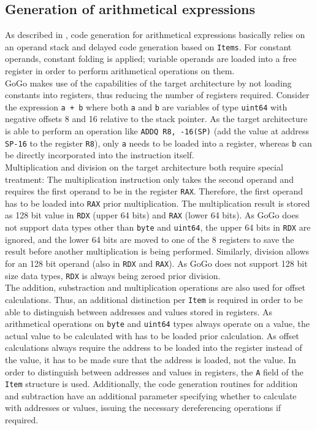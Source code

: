 \documentclass[a4paper]{scrartcl}
\let\section\subsection
\let\subsection\subsubsection
\let\subsubsection\paragraph
\let\paragraph\subparagraph
\let\subparagraph\undefined
\begin{document}
    \section{Generation of arithmetical expressions}
      As described in \cite{wir96}, code generation for arithmetical expressions basically relies on an operand stack and delayed code generation based on \texttt{Items}. For constant operands, constant folding is applied; variable operands are loaded into a free register in order to perform arithmetical operations on them.\\
      GoGo makes use of the capabilities of the target architecture by not loading constants into registers, thus reducing the number of registers required. Consider the expression \texttt{a + b} where both \texttt{a} and \texttt{b} are variables of type \texttt{uint64} with negative offsets 8 and 16 relative to the stack pointer. As the target architecture is able to perform an operation like \texttt{ADDQ R8, -16(SP)} (add the value at address \texttt{SP-16} to the register \texttt{R8}), only \texttt{a} needs to be loaded into a register, whereas \texttt{b} can be directly incorporated into the instruction itself.\\
      Multiplication and division on the target architecture both require special treatment: The multiplication instruction only takes the second operand and requires the first operand to be in the register \texttt{RAX}\cite{int09}. Therefore, the first operand has to be loaded into \texttt{RAX} prior multiplication. The multiplication result is stored as 128 bit value in \texttt{RDX} (upper 64 bits) and \texttt{RAX} (lower 64 bits). As GoGo does not support data types other than \texttt{byte} and \texttt{uint64}, the upper 64 bits in \texttt{RDX} are ignored, and the lower 64 bits are moved to one of the 8 registers to save the result before another multiplication is being performed. Similarly, division allows for an 128 bit operand (also in \texttt{RDX} and \texttt{RAX}). As GoGo does not support 128 bit size data types, \texttt{RDX} is always being zeroed prior division.\\
      The addition, substraction and multiplication operations are also used for offset calculations. Thus, an additional distinction per \texttt{Item} is required in order to be able to distinguish between addresses and values stored in registers. As arithmetical operations on \texttt{byte} and \texttt{uint64} types always operate on a value, the actual value to be calculated with has to be loaded prior calculation. As offset calculations always require the address to be loaded into the register instead of the value, it has to be made sure that the address is loaded, not the value. In order to distinguish between addresses and values in registers, the \texttt{A} field of the \texttt{Item} structure is used. Additionally, the code generation routines for addition and subtraction have an additional parameter specifying whether to calculate with addresses or values, issuing the necessary dereferencing operations if required.
\end{document}
